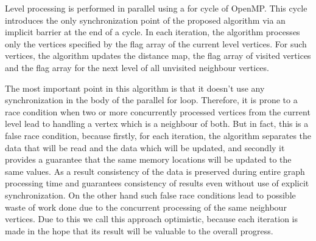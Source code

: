 \documentclass[letterpaper]{article}
\begin{document}
			Level processing is performed in parallel using a for cycle of OpenMP.
			This cycle introduces the only synchronization point of the proposed algorithm via an implicit barrier at the end of a cycle.
			In each iteration, the algorithm processes only the vertices specified by the flag array of the current level vertices.
			For such vertices, the algorithm updates the distance map, the flag array of visited vertices and the flag array for the next level of all unvisited neighbour vertices.
			
			The most important point in this algorithm is that it doesn't use any synchronization in the body of the parallel for loop.
			Therefore, it is prone to a race condition when two or more concurrently processed vertices from the current level lead to handling a vertex which is a neighbour of both.
			But in fact, this is a false race condition, because firstly, for each iteration, the algorithm separates the data that will be read and the data which will be updated, and secondly it provides a guarantee that the same memory locations will be updated to the same values.
			As a result consistency of the data is preserved during entire graph processing time and guarantees consistency of results even without use of explicit synchronization.
			On the other hand such false race conditions lead to possible waste of work done due to the concurrent processing of the same neighbour vertices.
			Due to this we call this approach optimistic, because each iteration is made in the hope that its result will be valuable to the overall progress.  
			
			
\end{document}
